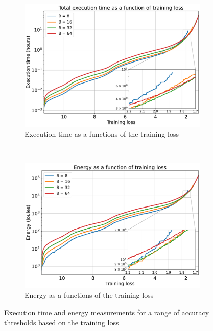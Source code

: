 \documentclass{article}
\begin{document}
{        \begin{figure}[!t]
            \centering
            \begin{subfigure}[b]{0.47 \textwidth}
                \includegraphics[trim = {0.0in 0.00in 0.0in 0.0in}, clip, width = 1.02 \textwidth]{../Figures/accuracy_vs_time_training.pdf}
                \caption{Execution time as a functions of the training loss}
                \label{fig:accuracy_vs_time_training}
            \end{subfigure}
            ~
            \begin{subfigure}[b]{0.47 \textwidth}
                \includegraphics[trim = {0.0in 0.0in 0.0in 0.0in}, clip, width = 1.0 \textwidth]{../Figures/accuracy_vs_energy_training.pdf}
                \caption{Energy as a functions of the training loss}
                \label{fig:accuracy_vs_energy_training}
            \end{subfigure}
            \caption{Execution time and energy measurements for a range of accuracy thresholds based on the training loss}
            \label{fig:accuracy_vs_time_and_energy_training}
        \end{figure}
    }
\end{document}
